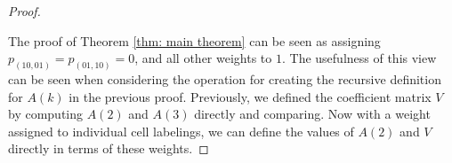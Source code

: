 \documentclass[12pt]{article}
\theoremstyle{plain}
\theoremstyle{definition}
\theoremstyle{remark}
\theoremstyle{definition}
\newcommand{\lablnode}[3]{\node[shape=circle,draw=none,fill=none, inner sep=0pt,minimum size=5pt] (A) at ( #1 , #2 ) {#3};}
\newcommand{\lablvertex}[3]{\node[shape=circle,draw=none,fill=white, inner sep=2pt,minimum size=5pt] (A) at ( #1 , #2 ) {#3};}
\begin{document}
\begin{proof}
\begin{center}
\end{center}

The proof of Theorem \ref{thm: main theorem} can be seen as assigning $p_{(10,01)} = p_{(01,10)} = 0$, and all other weights to $1$. The usefulness of this view can be seen when considering the operation for creating the recursive definition for $A(k)$ in the previous proof. Previously, we defined the coefficient matrix $V$ by computing $A(2)$ and $A(3)$ directly and comparing. Now with a weight assigned to individual cell labelings, we can define the values of $A(2)$ and $V$ directly in terms of these weights.


\end{proof}
\end{document}
